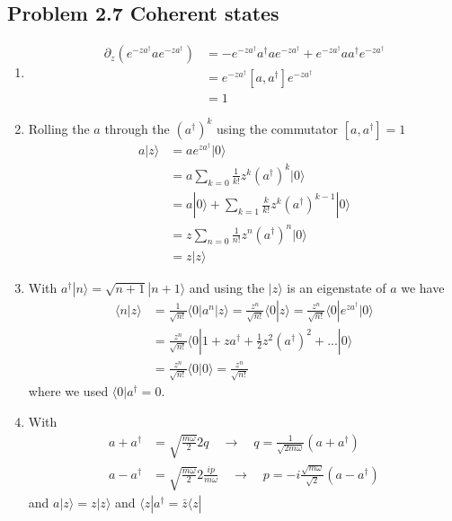 \documentclass[../main.tex]{subfiles}
\begin{document}
\subsection{Problem 2.7 Coherent states}
\begin{enumerate}
\item 
\begin{align}
    \partial_z\left(e^{-za^\dagger} a e^{-za^\dagger}\right)
    &=-e^{-za^\dagger}a^\dagger a e^{-za^\dagger}+e^{-za^\dagger} a a^\dagger e^{-za^\dagger}\\
    &=e^{-za^\dagger} [a,a^\dagger] e^{-za^\dagger}\\
    &=1
\end{align}
\item Rolling the $a$ through the $(a^\dagger)^k$ using the commutator $[a,a^\dagger]=1$
\begin{align}
    a|z\rangle
    &=a e^{za^\dagger}|0\rangle\\
    &=a\sum_{k=0}\frac{1}{k!}z^k(a^\dagger)^k|0\rangle\\
    &=a|0\rangle+\sum_{k=1}\frac{k}{k!}z^k(a^\dagger)^{k-1}|0\rangle\\
    &=z\sum_{n=0}\frac{1}{n!}z^n(a^\dagger)^{n}|0\rangle\\
    &=z|z\rangle
\end{align}
\item With $a^\dagger|n\rangle=\sqrt{n+1}|n+1\rangle$ and using the $|z\rangle$ is an eigenstate of $a$ we have
\begin{align}
    \langle n|z\rangle&=\frac{1}{\sqrt{n!}}\langle0|a^n|z\rangle
    =\frac{z^n}{\sqrt{n!}}\langle0|z\rangle
    =\frac{z^n}{\sqrt{n!}}\langle0|e^{za^\dagger}|0\rangle\\
    &=\frac{z^n}{\sqrt{n!}}\langle0|1+za^\dagger+\frac{1}{2}z^2(a^\dagger)^2+...|0\rangle\\
    &=\frac{z^n}{\sqrt{n!}}\langle0|0\rangle
    =\frac{z^n}{\sqrt{n!}}
\end{align}
where we used $\langle0|a^\dagger=0$.
\item With
\begin{align}
    a+a^\dagger&=\sqrt{\frac{m\omega}{2}}2q\quad\rightarrow\quad q=\frac{1}{\sqrt{2m\omega}}(a+a^\dagger)\\
    a-a^\dagger&=\sqrt{\frac{m\omega}{2}}2\frac{ip}{m\omega}\quad\rightarrow\quad p=-i\frac{\sqrt{m\omega}}{\sqrt{2}}(a-a^\dagger)
\end{align}
and $a|z\rangle=z|z\rangle$ and $\langle z|a^\dagger=\bar{z}\langle z|$ 
\begin{align}

\end{align}
\end{enumerate}
\end{document}
